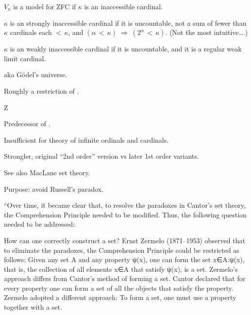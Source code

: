 $V_{\kappa}$ is a model for \textsf{ZFC} 
if $\kappa$ is an inaccessible cardinal\cite{wiki:Inaccessible_cardinal}.

$\kappa$ is an strongly inaccessible cardinal 
if it is uncountable, 
not a sum of fewer than $\kappa$ cardinals each $<\,\kappa$,
and
$(\alpha \,<\, \kappa) \;\Rightarrow\; (2^{\alpha}\,<\,\kappa)$.
(Not the most intuitive\ldots .)

$\kappa$ is an weakly inaccessible cardinal 
if it is uncountable,
and
it is a regular weak limit 
cardinal\cite{wiki:Regular_cardinal,wiki:Limit_cardinal}.

\label{sec:Constructible_universe}

aka G\"{o}del's universe\cite{wiki:Constructible_universe}.

Roughly a restriction of . 

\label{sec:Zermelo_set_theory}

\textsf{Z}\cite{wiki:Zermelo_set_theory}

Predecessor of .

Insufficient for theory of infinite 
ordinals\cite{wiki:Ordinal_number}
and cardinals.

Strongler, original ``2nd order'' version 
vs  later 1st order variants.

See also MacLane set theory\cite{maclane:mff:1986}.
\label{sec:Zermelo-Fraenkel-set-theory}

Purpose: avoid Russell's paradox\cite{wiki:Russell-paradox}.

``Over time, it became clear that, to resolve the paradoxes in Cantor’s set theory, the Comprehension Principle needed to be modified. Thus, the following question needed to be addressed:

How can one correctly construct a set? 
Ernst Zermelo (1871–1953) observed that to eliminate the paradoxes, the Comprehension Principle could be restricted as follows: Given any set A and any property ψ(x), one can form the set {x∈A:ψ(x)}, that is, the collection of all elements x∈A that satisfy ψ(x), is a set. Zermelo’s approach differs from Cantor’s method of forming a set. Cantor declared that for every property one can form a set of all the objects that satisfy the property. Zermelo adopted a different approach: To form a set, one must use a property together with a set.

